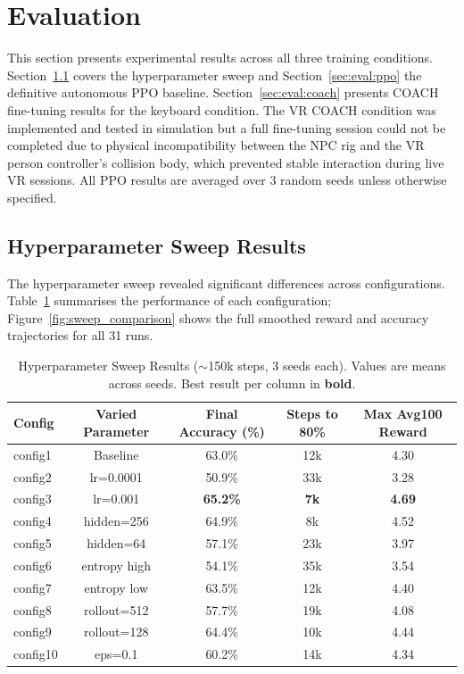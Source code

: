\documentclass[../report.tex]{subfiles}
\begin{document}
    \section{Evaluation}
    \label{sec:evaluation}

    This section presents experimental results across all three training conditions. Section~\ref{sec:eval:sweep} covers the hyperparameter sweep and Section~\ref{sec:eval:ppo} the definitive autonomous PPO baseline. Section~\ref{sec:eval:coach} presents COACH fine-tuning results for the keyboard condition. The VR COACH condition was implemented and tested in simulation but a full fine-tuning session could not be completed due to physical incompatibility between the NPC rig and the VR person controller's collision body, which prevented stable interaction during live VR sessions. All PPO results are averaged over 3 random seeds unless otherwise specified.

    \subsection{Hyperparameter Sweep Results}
    \label{sec:eval:sweep}

    The hyperparameter sweep revealed significant differences across configurations. Table~\ref{tab:sweep-results} summarises the performance of each configuration; Figure~\ref{fig:sweep_comparison} shows the full smoothed reward and accuracy trajectories for all 31 runs.

    \begin{table}[t]
        \centering
        \caption{Hyperparameter Sweep Results ($\sim$150k steps, 3 seeds each). Values are means across seeds. Best result per column in \textbf{bold}.}
        \label{tab:sweep-results}
        \begin{tabular}{lcccc}
            \toprule
            \textbf{Config} & \textbf{Varied Parameter} & \textbf{Final Accuracy (\%)} & \textbf{Steps to 80\%} & \textbf{Max Avg100 Reward} \\
            \midrule
            config1  & Baseline      & 63.0\% & 12k  & 4.30 \\
            config2  & lr=0.0001     & 50.9\% & 33k  & 3.28 \\
            config3  & lr=0.001      & \textbf{65.2\%} & \textbf{7k}  & \textbf{4.69} \\
            config4  & hidden=256    & 64.9\% & 8k  & 4.52 \\
            config5  & hidden=64     & 57.1\% & 23k  & 3.97 \\
            config6  & entropy high  & 54.1\% & 35k  & 3.54 \\
            config7  & entropy low   & 63.5\% & 12k  & 4.40 \\
            config8  & rollout=512   & 57.7\% & 19k  & 4.08 \\
            config9  & rollout=128   & 64.4\% & 10k  & 4.44 \\
            config10 & eps=0.1       & 60.2\% & 14k  & 4.34 \\
            \bottomrule
        \end{tabular}
    \end{table}
\end{document}
